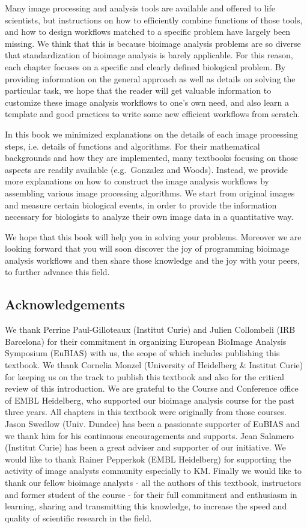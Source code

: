 Many image processing and analysis tools are available and offered to
life scientists, but instructions on how to efficiently combine functions of those tools, 
and how to design workflows matched to a specific problem have largely been missing. 
We think that this is because bioimage analysis problems are so diverse that
standardization of bioimage analysis is barely applicable. For this
reason, each chapter focuses on a specific and clearly defined biological
problem. By providing information on the general approach as well as details on solving the particular task, we hope that the reader will get valuable information to customize these image analysis workflows to one's own need, and also learn a template and good practices to  write some new efficient workflows from scratch.

In this book we minimized explanations on the details of each
image processing steps, i.e. details of functions and algorithms. For their mathematical backgrounds and how they
are implemented, many textbooks focusing on those aspects are readily available (e.g.~Gonzalez and Woods). Instead, we provide more explanations on how to construct the image analysis workflows by
assembling various image processing algorithms. We start from original
images and measure certain biological events, in order to provide the 
information necessary for biologists to analyze their own image data in a quantitative way. 

We hope that this book will help you in solving your problems. Moreover we are looking forward that you will soon discover the joy of programming bioimage analysis workflows and then share those knowledge and the joy with your peers, to further advance this field.

\subsection{Acknowledgements}\label{acknowledgements}

We thank Perrine Paul-Gilloteaux (Institut Curie) and Julien Collombeli (IRB Barcelona) for their commitment in organizing European BioImage Analysis Symposium (EuBIAS) with us, the scope of which includes publishing this textbook. We thank Cornelia Monzel (University of Heidelberg \& Institut Curie) for keeping us on the track to publish this textbook and also for the critical review of this introduction. We are grateful to the Course and Conference office of EMBL Heidelberg, who supported our bioimage analysis course for the past three years. All chapters in this textbook were originally from those courses. Jason Swedlow (Univ. Dundee) has been a passionate supporter of EuBIAS and we thank him for his continuous encouragements and supports. Jean Salamero (Institut Curie) has been a great adviser and supporter of our initiative. We would like to thank Rainer Pepperkok (EMBL Heidelberg) for supporting the activity of image analysts community especially to KM.  Finally we would like to thank our fellow bioimage analysts - all the authors of this textbook, instructors and former student of the course - for their full commitment and enthusiasm in learning, sharing and  transmitting this knowledge, to increase the speed and quality of scientific research in the field.

